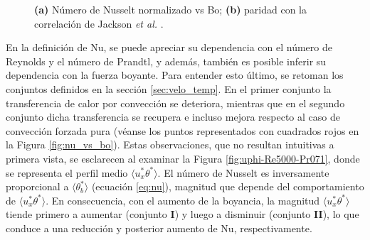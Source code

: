 \newpage

\begin{figure}[H]
  \centering
  \caption{\textbf{(a)} Número de Nusselt normalizado vs Bo; \textbf{(b)} paridad con la correlación de Jackson \textit{et al.} \cite{jackson1989studies}.}
  \label{fig:nusselt}
\end{figure}

En la definición de Nu, se puede apreciar su dependencia con el número de Reynolds y el número de Prandtl, y además, también es posible inferir su dependencia con la fuerza boyante. Para entender esto último, se retoman los conjuntos definidos en la sección \ref{sec:velo_temp}. En el primer conjunto la transferencia de calor por convección se deteriora, mientras que en el segundo conjunto dicha transferencia se recupera e incluso mejora respecto al caso de convección forzada pura (véanse los puntos representados con cuadrados rojos en la Figura \ref{fig:nu_vs_bo}). Estas observaciones, que no resultan intuitivas a primera vista, se esclarecen al examinar la Figura \ref{fig:uphi-Re5000-Pr071}, donde se representa el perfil medio $\langle u_x^{*}\theta^{*}\rangle$. El número de Nusselt es inversamente proporcional a $\langle\theta^{*}_b\rangle$ (ecuación \ref{eq:nu}), magnitud que depende del comportamiento de $\langle u_x^{*}\theta^{*}\rangle$. En consecuencia, con el aumento de la boyancia, la magnitud  $\langle u_x^{*}\theta^{*}\rangle$ tiende primero a aumentar (conjunto \textbf{I}) y luego a disminuir (conjunto \textbf{II}), lo que conduce a una reducción y posterior aumento de Nu, respectivamente. 


